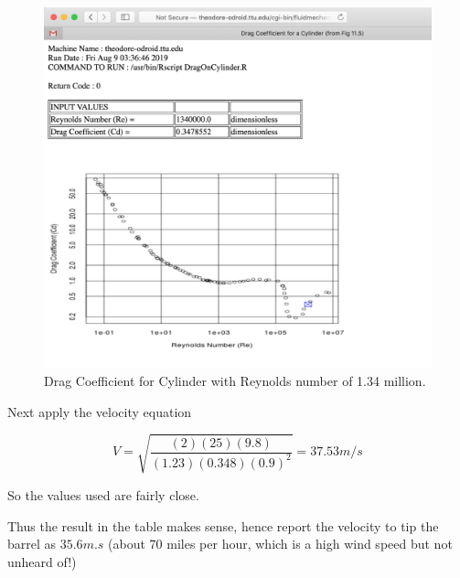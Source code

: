 \documentclass[12pt]{article}
\begin{document}
\begin{figure}[h!] %
   \centering
   \includegraphics[width=5in]{CdComputed.pdf} 
   \caption{Drag Coefficient for Cylinder with Reynolds number of 1.34 million.}
   \label{fig:CdComputed}
\end{figure}

Next apply the velocity equation

\begin{equation}
V=\sqrt{ \frac{(2)(25)(9.8) }{(1.23)(0.348)(0.9)^2} } = 37.53 m/s
\end{equation}

So the values used are fairly close.

Thus the result in the table makes sense, hence report the velocity to tip the barrel as $35.6 m.s$ (about 70 miles per hour, which is a high wind speed but not unheard of!)
\clearpage
\end{document}
